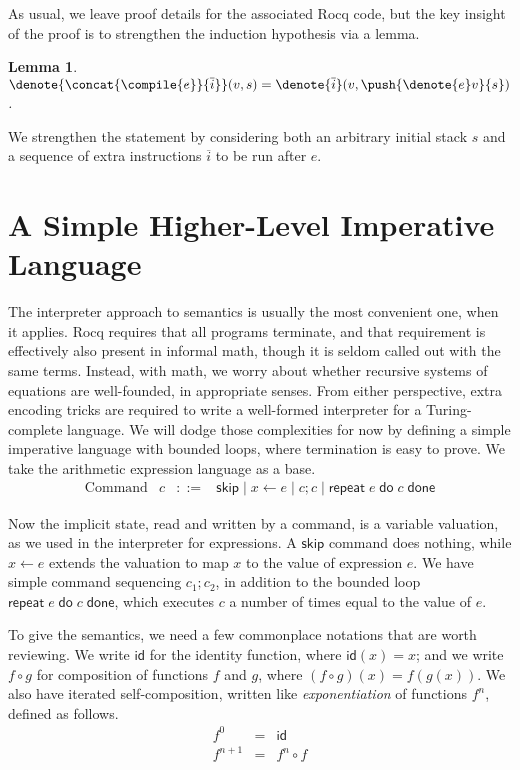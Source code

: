 \documentclass{amsbook}
\newtheorem{lemma}[theorem]{Lemma}
\theoremstyle{definition}
\theoremstyle{remark}
\numberwithin{section}{chapter}
\numberwithin{equation}{chapter}
\begin{document}
As usual, we leave proof details for the associated Rocq code, but the key insight of the proof is to strengthen the induction hypothesis via a lemma.

\begin{lemma}
  $\denote{\concat{\compile{e}}{\overline{i}}}(v, s) = \denote{\overline{i}}(v, \push{\denote{e}v}{s})$.
\end{lemma}

We strengthen the statement by considering both an arbitrary initial stack $s$ and a sequence of extra instructions $\overline{i}$ to be run after $e$.

\section{A Simple Higher-Level Imperative Language}

\newcommand{\repet}[2]{\mathsf{repeat} \; #1 \; \mathsf{do} \; #2 \; \mathsf{done}}

The interpreter approach to semantics is usually the most convenient one, when it applies.
Rocq requires that all programs terminate, and that requirement is effectively also present in informal math, though it is seldom called out with the same terms.
Instead, with math, we worry about whether recursive systems of equations are well-founded, in appropriate senses.
From either perspective, extra encoding tricks are required to write a well-formed interpreter for a Turing-complete language.
We will dodge those complexities for now by defining a simple imperative language with bounded loops, where termination is easy to prove.
We take the arithmetic expression language as a base.
\encoding
$$\begin{array}{rrcl}
  \textrm{Command} & c &::=& \mathsf{skip} \mid x \leftarrow e \mid c; c \mid \repet{e}{c}
\end{array}$$

Now the implicit state, read and written by a command, is a variable valuation, as we used in the interpreter for expressions.
A $\mathsf{skip}$ command does nothing, while $x \leftarrow e$ extends the valuation to map $x$ to the value of expression $e$.
We have simple command sequencing $c_1; c_2$, in addition to the bounded loop $\repet{e}{c}$, which executes $c$ a number of times equal to the value of $e$.

\newcommand{\id}[0]{\mathsf{id}}

To give the semantics, we need a few commonplace notations that are worth reviewing.
We write $\id$ for the identity function, where $\id(x) = x$; and we write $f \circ g$ for composition of functions $f$ and $g$, where $(f \circ g)(x) = f(g(x))$.
We also have iterated self-composition, written like \emph{exponentiation} of functions $f^n$, defined as follows.
\begin{eqnarray*}
  f^0 &=& \id \\
  f^{n+1} &=& f^n \circ f
\end{eqnarray*}
\end{document}
